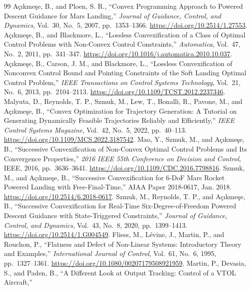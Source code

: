 \documentclass[10pt,letterpaper]{article}
\theoremstyle{aiaa}
\begin{document}
\begin{thebibliography}{99}
 A\c{c}{\i}kme\c{s}e, B., and Ploen, S. R., ``Convex Programming Approach to Powered Descent Guidance for Mars
Landing,'' \emph{Journal of Guidance, Control, and Dynamics}, Vol.~30, No.~5, 2007, pp.~1353--1366. \url{https://doi.org/10.2514/1.27553}.
 A\c{c}{\i}kme\c{s}e, B., and Blackmore, L., ``Lossless Convexification of a Class of Optimal Control Problems
with Non-Convex Control Constraints,'' \emph{Automatica}, Vol.~47, No.~2, 2011, pp.~341--347. \url{https://doi.org/10.1016/j.automatica.2010.10.037}.
 A\c{c}{\i}kme\c{s}e, B., Carson, J. M., and Blackmore, L., ``Lossless Convexification of Nonconvex Control Bound
and Pointing Constraints of the Soft Landing Optimal Control Problem,'' \emph{IEEE Transactions on Control Systems Technology},
Vol.~21, No.~6, 2013, pp.~2104--2113. \url{https://doi.org/10.1109/TCST.2012.2237346}.
 Malyuta, D., Reynolds, T. P., Szmuk, M., Lew, T., Bonalli, R., Pavone, M., and A\c{c}{\i}kme\c{s}e, B., ``Convex
Optimization for Trajectory Generation: A Tutorial on Generating Dynamically Feasible Trajectories Reliably and Efficiently,''
\emph{IEEE Control Systems Magazine}, Vol.~42, No.~5, 2022, pp.~40--113. \url{https://doi.org/10.1109/MCS.2022.3187542}.
 Mao, Y., Szmuk, M., and A\c{c}{\i}kme\c{s}e, B., ``Successive Convexification of Non-Convex Optimal Control Problems
and Its Convergence Properties,'' \emph{2016 IEEE 55th Conference on Decision and Control}, IEEE, 2016, pp.~3636--3641.
\url{https://doi.org/10.1109/CDC.2016.7798816}.
 Szmuk, M., and A\c{c}{\i}kme\c{s}e, B., ``Successive Convexification for 6-DoF Mars Rocket Powered Landing with
Free-Final-Time,'' AIAA Paper 2018-0617, Jan. 2018. \url{https://doi.org/10.2514/6.2018-0617}.
 Szmuk, M., Reynolds, T. P., and A\c{c}{\i}kme\c{s}e, B., ``Successive Convexification for Real-Time
Six-Degree-of-Freedom Powered Descent Guidance with State-Triggered Constraints,'' \emph{Journal of Guidance, Control, and
Dynamics}, Vol.~43, No.~8, 2020, pp.~1399--1413. \url{https://doi.org/10.2514/1.G004549}.
 Fliess, M., L\'evine, J., Martin, P., and Rouchon, P., ``Flatness and Defect of Non-Linear Systems: Introductory
Theory and Examples,'' \emph{International Journal of Control}, Vol.~61, No.~6, 1995, pp.~1327--1361. \url{https://doi.org/10.1080/00207179508921959}.
 Martin, P., Devasia, S., and Paden, B., ``A Different Look at Output Tracking: Control of a VTOL Aircraft,''

\end{thebibliography}
\end{document}
